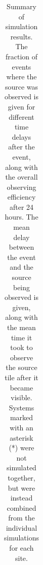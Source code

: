 \begin{colsection}
\begin{table}[p]
\begin{center}
\begin{tabular}{c|cccc|c|cc}
        \end{tabular}
    \end{center}
    \caption[GW simulation results summary table]{
        Summary of simulation results. The fraction of events where the source was observed is given for different time delays after the event, along with the overall observing efficiency after 24 hours. The mean delay between the event and the source being observed is given, along with the mean time it took to observe the source tile after it became visible. Systems marked with an asterisk (*) were not simulated together, but were instead combined from the individual simulations for each site.
    }\label{tab:gw_sim_results}
\end{table}

\clearpage

\end{colsection}


